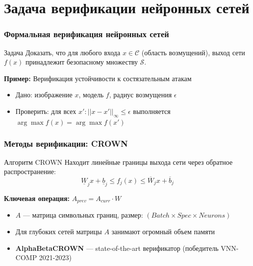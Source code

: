 
\section{Задача верификации нейронных сетей}

\begin{frame}
\frametitle{Формальная верификация нейронных сетей}

\begin{block}{Задача}
Доказать, что для любого входа $x \in \mathcal{C}$ (область возмущений), выход сети $f(x)$ принадлежит безопасному множеству $\mathcal{S}$.
\end{block}

\vspace{0.5cm}

\textbf{Пример:} Верификация устойчивости к состязательным атакам
\begin{itemize}
    \item Дано: изображение $x$, модель $f$, радиус возмущения $\epsilon$
    \item Проверить: для всех $x' : ||x - x'||_\infty \leq \epsilon$ выполняется $\arg\max f(x) = \arg\max f(x')$
\end{itemize}

\end{frame}

\begin{frame}
\frametitle{Методы верификации: CROWN}

\begin{block}{Алгоритм CROWN}
Находит линейные границы выхода сети через обратное распространение:
$$\underline{W}_j x + \underline{b}_j \leq f_j(x) \leq \overline{W}_j x + \overline{b}_j$$
\end{block}

\vspace{0.3cm}

\textbf{Ключевая операция:} $A_{prev} = A_{curr} \cdot W$

\begin{itemize}
    \item $A$ --- матрица символьных границ, размер: $(Batch \times Spec \times Neurons)$
    \item Для глубоких сетей матрицы $A$ занимают огромный объем памяти
    \item \textbf{AlphaBetaCROWN} --- state-of-the-art верификатор (победитель VNN-COMP 2021-2023)
\end{itemize}

\end{frame}

